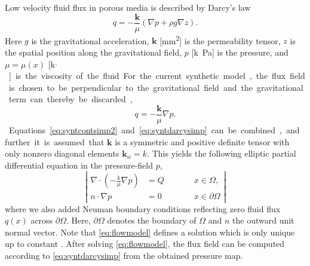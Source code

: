 \documentclass[paper=a4, fontsize=11pt,parskip=half,headings=small]{scrartcl}
\newcommand{\simu}{k\pascal$\cdot$\second}
\begin{document}
	Low velocity fluid flux in porous media is described by Darcy's law \cite{Darcy56}
	\begin{equation}
		q = -\frac{\mathbf{k}}{\mu} \left( \nabla p + \rho g  \nabla z \right).
	\end{equation}
	Here $g$ is the gravitational acceleration, $\mathbf{k}$ [\si{\square\milli\meter}] is the permeability tensor, $z$ is the spatial position along the gravitational field, $p$ [\si{k\pascal}] is the pressure, and $\mu = \mu(x)$ [\si{\simu}] is the viscosity of the fluid. 
	For the current synthetic model, the flux field is chosen to be perpendicular to the gravitational field and the gravitational term can thereby be discarded,
	\begin{equation}
		q = -\frac{\mathbf{k}}{\mu} \nabla p.
		\label{eq:syntdarcysimp}
	\end{equation}
	Equations \eqref{eq:syntcontsimp2} and \eqref{eq:syntdarcysimp} can be combined, and further it is assumed that $\mathbf{k}$ is a symmetric and positive definite tensor with only nonzero diagonal elements $\mathbf{k}_{ii} = k$.
	This yields the following elliptic partial differential equation in the pressure-field $p$,
	\begin{equation}
		\left\vert
		\begin{alignedat}{2}
			\nabla \cdot \left( -\frac{k}{\mu} \nabla p \right) &= Q  \qquad &&x \in \Omega, \\
			n \cdot \nabla p &=0 &&x \in \partial \Omega
		\end{alignedat}
		\right\vert 
		\label{eq:flowmodel}
	\end{equation}
	where we also added Neuman boundary conditions reflecting zero fluid flux $q(x)$ across $\partial \Omega$.
	Here, $\partial \Omega$ denotes the boundary of $\Omega$ and $n$ the outward unit normal vector. 
	Note that \eqref{eq:flowmodel} defines a solution which is only unique up to constant \cite{evans98}.
	After solving \eqref{eq:flowmodel}, the flux field can be computed according to \eqref{eq:syntdarcysimp} from the obtained pressure map. 
	
	
\end{document}
